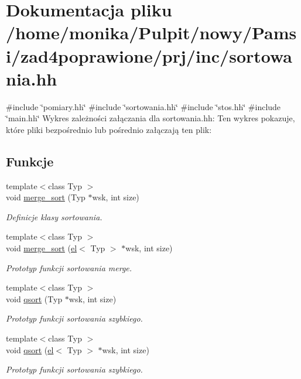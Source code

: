 \hypertarget{sortowania_8hh}{\section{\-Dokumentacja pliku /home/monika/\-Pulpit/nowy/\-Pamsi/zad4poprawione/prj/inc/sortowania.hh}
\label{sortowania_8hh}
}
{\ttfamily \#include \char`\"{}pomiary.\-hh\char`\"{}}\*
{\ttfamily \#include \char`\"{}sortowania.\-hh\char`\"{}}\*
{\ttfamily \#include \char`\"{}stos.\-hh\char`\"{}}\*
{\ttfamily \#include \char`\"{}main.\-hh\char`\"{}}\*
\-Wykres zależności załączania dla sortowania.\-hh\-:
\-Ten wykres pokazuje, które pliki bezpośrednio lub pośrednio załączają ten plik\-:
\subsection*{\-Funkcje}
\begin{DoxyCompactItemize}
\item 
{\footnotesize template$<$class Typ $>$ }\\void \hyperlink{sortowania_8hh_adfe1e073cd89e08ac3ccef182ee5950a}{merge\-\_\-sort} (\-Typ $\ast$wsk, int size)
\begin{DoxyCompactList}\small\item\em \-Definicje klasy sortowania. \end{DoxyCompactList}\item 
{\footnotesize template$<$class Typ $>$ }\\void \hyperlink{sortowania_8hh_acafaaefff6693e132727c9558200c364}{merge\-\_\-sort} (\hyperlink{classel}{el}$<$ \-Typ $>$ $\ast$wsk, int size)
\begin{DoxyCompactList}\small\item\em \-Prototyp funkcji sortowania merge. \end{DoxyCompactList}\item 
{\footnotesize template$<$class Typ $>$ }\\void \hyperlink{sortowania_8hh_a3f56cc7fcc2745ee52c1a3e22a88ddb4}{qsort} (\-Typ $\ast$wsk, int size)
\begin{DoxyCompactList}\small\item\em \-Prototyp funkcji sortowania szybkiego. \end{DoxyCompactList}\item 
{\footnotesize template$<$class Typ $>$ }\\void \hyperlink{sortowania_8hh_af84c8cbe272c47643c9ad1703b5b6cbd}{qsort} (\hyperlink{classel}{el}$<$ \-Typ $>$ $\ast$wsk, int size)
\begin{DoxyCompactList}\small\item\em \-Prototyp funkcji sortowania szybkiego. \end{DoxyCompactList}\end{DoxyCompactItemize}


